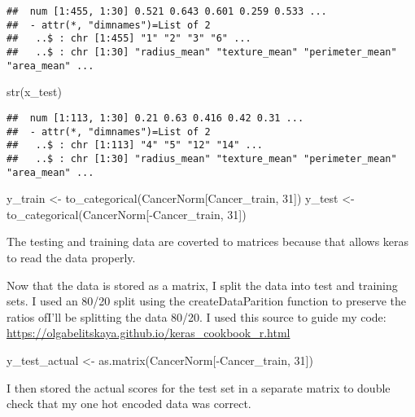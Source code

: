 \documentclass[
]{article}
\newenvironment{Shaded}{\begin{snugshade}}{\end{snugshade}}
\newcommand{\DecValTok}[1]{\textcolor[rgb]{0.00,0.00,0.81}{#1}}
\newcommand{\FunctionTok}[1]{\textcolor[rgb]{0.00,0.00,0.00}{#1}}
\newcommand{\NormalTok}[1]{#1}
\newcommand{\OtherTok}[1]{\textcolor[rgb]{0.56,0.35,0.01}{#1}}
\newcommand{\SpecialCharTok}[1]{\textcolor[rgb]{0.00,0.00,0.00}{#1}}
\begin{document}
\begin{verbatim}
##  num [1:455, 1:30] 0.521 0.643 0.601 0.259 0.533 ...
##  - attr(*, "dimnames")=List of 2
##   ..$ : chr [1:455] "1" "2" "3" "6" ...
##   ..$ : chr [1:30] "radius_mean" "texture_mean" "perimeter_mean" "area_mean" ...
\end{verbatim}

\begin{Shaded}
\begin{Highlighting}[]
\FunctionTok{str}\NormalTok{(x\_test)}
\end{Highlighting}
\end{Shaded}

\begin{verbatim}
##  num [1:113, 1:30] 0.21 0.63 0.416 0.42 0.31 ...
##  - attr(*, "dimnames")=List of 2
##   ..$ : chr [1:113] "4" "5" "12" "14" ...
##   ..$ : chr [1:30] "radius_mean" "texture_mean" "perimeter_mean" "area_mean" ...
\end{verbatim}

\begin{Shaded}
\begin{Highlighting}[]
\NormalTok{y\_train }\OtherTok{\textless{}{-}} \FunctionTok{to\_categorical}\NormalTok{(CancerNorm[Cancer\_train, }\DecValTok{31}\NormalTok{])}
\NormalTok{y\_test }\OtherTok{\textless{}{-}} \FunctionTok{to\_categorical}\NormalTok{(CancerNorm[}\SpecialCharTok{{-}}\NormalTok{Cancer\_train, }\DecValTok{31}\NormalTok{])}
\end{Highlighting}
\end{Shaded}

The testing and training data are coverted to matrices because that
allows keras to read the data properly.

Now that the data is stored as a matrix, I split the data into test and
training sets. I used an 80/20 split using the createDataParition
function to preserve the ratios ofI'll be splitting the data 80/20. I
used this source to guide my code:
\url{https://olgabelitskaya.github.io/keras_cookbook_r.html}

\begin{Shaded}
\begin{Highlighting}[]
\NormalTok{y\_test\_actual }\OtherTok{\textless{}{-}} \FunctionTok{as.matrix}\NormalTok{(CancerNorm[}\SpecialCharTok{{-}}\NormalTok{Cancer\_train, }\DecValTok{31}\NormalTok{])}
\end{Highlighting}
\end{Shaded}

I then stored the actual scores for the test set in a separate matrix to
double check that my one hot encoded data was correct.
\end{document}

